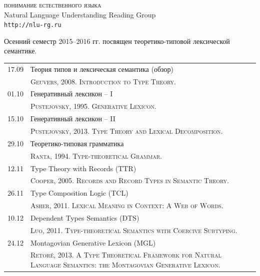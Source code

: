 \documentclass[12pt]{article}
\begin{document}

\parindent 0mm


\begin{center}
{\rm \Huge \textsc{понимание естественного языка}}\\
\bigskip
{\rm \Large Natural Language Understanding Reading Group}\\
\bigskip
{\rm \Large \texttt{http://nlu-rg.ru}}
\end{center}

\bigskip
\medskip

\begin{spacing}{1.2}
\hfill
\parbox{0.986\textwidth}{
Осенний семестр 2015--2016 гг. посвящен теоретико-типовой лексической семантике.
}
\end{spacing}

\medskip

\begin{table}[h!]
\begin{tabularx}{\textwidth}{cX}
17.09 & Теория типов и лексическая семантика (обзор) \bigstrut[t] \\
      & {\scriptsize \textsc{Geuvers, 2008. Introduction to Type Theory.}} \bigstrut[b] \\
01.10 & Генеративный лексикон -- I \bigstrut[t] \\
      & {\scriptsize \textsc{Pustejovsky, 1995. Generative Lexicon.}} \bigstrut[b] \\
15.10 & Генеративный лексикон -- II \bigstrut[t] \\
      & {\scriptsize \textsc{Pustejovsky, 2013. Type Theory and Lexical Decomposition.}} \bigstrut[b] \\
29.10 & Теоретико-типовая грамматика \bigstrut[t] \\
      & {\scriptsize \textsc{Ranta, 1994. Type-theoretical Grammar.}} \bigstrut[b] \\
12.11 & Type Theory with Records (TTR) \bigstrut[t] \\
      & {\scriptsize \textsc{Cooper, 2005. Records and Record Types in Semantic Theory.}} \bigstrut[b] \\
26.11 & Type Composition Logic (TCL)  \bigstrut[t] \\
      & {\scriptsize \textsc{Asher, 2011. Lexical Meaning in Context: A Web of Words.}} \bigstrut[b] \\
10.12 & Dependent Types Semantics (DTS)  \bigstrut[t] \\
      & {\scriptsize \textsc{Luo, 2011. Type-theoretical Semantics with Coercive Subtyping.}} \bigstrut[b] \\
24.12 & Montagovian Generative Lexicon (MGL) \bigstrut[t] \\ 
      & {\scriptsize \textsc{Retor\'{e}, 2013. A Type Theoretical Framework for Natural Language Semantics: the Montagovian Generative Lexicon.}} \bigstrut[b] \\ 
\end{tabularx}
\end{table}
\end{document}
